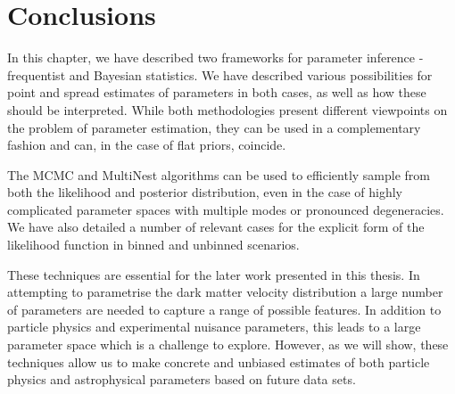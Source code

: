 

\section{Conclusions}

In this chapter, we have described two frameworks for parameter inference - frequentist and Bayesian statistics. We have described various possibilities for point and spread estimates of parameters in both cases, as well as how these should be interpreted. While both methodologies present different viewpoints on the problem of parameter estimation, they can be used in a complementary fashion and can, in the case of flat priors, coincide.

The MCMC and MultiNest algorithms can be used to efficiently sample from both the likelihood and posterior distribution, even in the case of highly complicated parameter spaces with multiple modes or pronounced degeneracies. We have also detailed a number of relevant cases for the explicit form of the likelihood function in binned and unbinned scenarios.

These techniques are essential for the later work presented in this thesis. In attempting to parametrise the dark matter velocity distribution a large number of parameters are needed to capture a range of possible features. In addition to particle physics and experimental nuisance parameters, this leads to a large parameter space which is a challenge to explore. However, as we will show, these techniques allow us to make concrete and unbiased estimates of both particle physics and astrophysical parameters based on future data sets.
